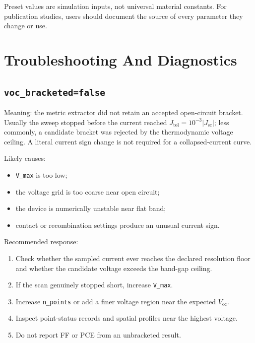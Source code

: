 \documentclass[
  11pt,
  american,
]{report}
\providecommand{\tightlist}{%
  \setlength{\itemsep}{0pt}\setlength{\parskip}{0pt}}
\begin{document}
Preset values are simulation inputs, not universal material constants.
For publication studies, users should document the source of every
parameter they change or use.

\hypertarget{troubleshooting-and-diagnostics}{%
\chapter{Troubleshooting And
Diagnostics}\label{troubleshooting-and-diagnostics}}

\hypertarget{voc_bracketedfalse}{%
\section{\texorpdfstring{\texttt{voc\_bracketed=false}}{voc\_bracketed=false}}\label{voc_bracketedfalse}}

Meaning: the metric extractor did not retain an accepted open-circuit
bracket. Usually the sweep stopped before the current reached
\(J_\mathrm{tol}=10^{-3}|J_\mathrm{sc}|\); less commonly, a candidate
bracket was rejected by the thermodynamic voltage ceiling. A literal
current sign change is not required for a collapsed-current curve.

Likely causes:

\begin{itemize}
\tightlist
\item
  \texttt{V\_max} is too low;
\item
  the voltage grid is too coarse near open circuit;
\item
  the device is numerically unstable near flat band;
\item
  contact or recombination settings produce an unusual current sign.
\end{itemize}

Recommended response:

\begin{enumerate}
\def\labelenumi{\arabic{enumi}.}
\tightlist
\item
  Check whether the sampled current ever reaches the declared resolution
  floor and whether the candidate voltage exceeds the band-gap ceiling.
\item
  If the scan genuinely stopped short, increase \texttt{V\_max}.
\item
  Increase \texttt{n\_points} or add a finer voltage region near the
  expected \(V_\mathrm{oc}\).
\item
  Inspect point-status records and spatial profiles near the highest
  voltage.
\item
  Do not report FF or PCE from an unbracketed result.
\end{enumerate}
\end{document}
